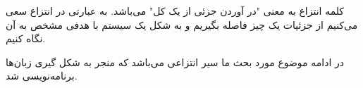 \begin{flushright}
    کلمه انتزاع به معنی "در آوردن جزئی از یک کل" می‌باشد.
    به عبارتی در انتزاع سعی می‌کنیم از جزئیات یک چیز فاصله بگیریم و به شکل یک سیستم با هدفی مشخص به آن نگاه کنیم.

    در ادامه موضوع مورد بحث ما سیر انتزاعی می‌باشد که منجر به شکل گیری زبان‌ها برنامه‌نویسی شد.
    \newpage
\end{flushright}